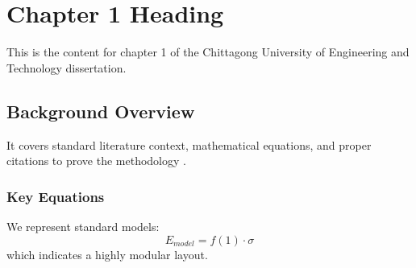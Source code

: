 \chapter{Chapter 1 Heading}
\label{ch:chapter1}
This is the content for chapter 1 of the Chittagong University of Engineering and Technology dissertation.

\section{Background Overview}
It covers standard literature context, mathematical equations, and proper citations to prove the methodology \cite{texbook}.

\subsection{Key Equations}
We represent standard models:
\begin{equation}
    E_{model} = f(1) \cdot \sigma
\end{equation}
which indicates a highly modular layout.
